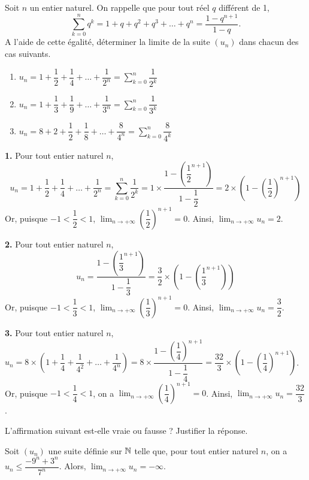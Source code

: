 \documentclass[11pt,fleqn, openany]{book} %
\begin{document}
\begin{exercise}[topic=lim12]Soit $n$ un entier naturel. On rappelle que pour tout réel $q$ différent de 1, 
\[\displaystyle \sum_{k=0}^{n}q^k= 1+q+q^2+q^3+\ldots + q^n=\dfrac{1-q^{n+1}}{1-q}.\]
A l'aide de cette égalité, déterminer la limite de la suite $(u_n)$ dans chacun des cas suivants.
\begin{enumerate}
\item  $u_n=1+\dfrac{1}{2}+\dfrac{1}{4}+\ldots+\dfrac{1}{2^n}=\displaystyle \sum_{k=0}^{n} \dfrac{1}{2^k} $ 
\item  $u_n=1+\dfrac{1}{3}+\dfrac{1}{9}+\ldots+\dfrac{1}{3^n}=\displaystyle \sum_{k=0}^{n} \dfrac{1}{3^k} $ 
\item $u_n=8+2+\dfrac{1}{2}+\dfrac{1}{8}+\ldots+\dfrac{8}{4^n}=\displaystyle \sum_{k=0}^{n} \dfrac{8}{4^k} $ 
\end{enumerate}\end{exercise}

\begin{solution}\textbf{1.} Pour tout entier naturel $n$, \[u_n = 1+\dfrac{1}{2}+\dfrac{1}{4}+\ldots + \dfrac{1}{2^n} = \sum_{k=0}^n \dfrac{1}{2^k}=1 \times \dfrac{1-\left(\dfrac{1}{2}^{n+1}\right)}{1-\dfrac{1}{2}}=2\times \left(1-\left(\dfrac{1}{2}\right)^{n+1}\right)\] Or, puisque $-1<\dfrac{1}{2}<1$, $\displaystyle \lim_{n \to +\infty} \left(\dfrac{1}{2}\right)^{n+1}=0$. Ainsi, $\displaystyle \lim_{n \to +\infty}u_n =2$.

\textbf{2.} Pour tout entier naturel $n$, \[u_n = \dfrac{1-\left(\dfrac{1}{3}^{n+1}\right)}{1-\dfrac{1}{3}}=\dfrac{3}{2} \times \left(1-\left(\dfrac{1}{3}^{n+1}\right)\right)\]
Or, puisque $-1<\dfrac{1}{3}<1$, $\displaystyle \lim_{n \to +\infty} \left(\dfrac{1}{3}\right)^{n+1}=0$. Ainsi, $\displaystyle \lim_{n \to +\infty}u_n=\dfrac{3}{2}$.

\textbf{3.} Pour tout entier naturel $n$, $u_n=8 \times \left(1+\dfrac{1}{4}+\dfrac{1}{4^2}+\ldots +\dfrac{1}{4^n}\right)=8\times \dfrac{1-\left(\dfrac{1}{4}\right)^{n+1}}{1-\dfrac{1}{4}}=\dfrac{32}{3} \times \left(1-\left(\dfrac{1}{4}\right)^{n+1}\right)$. Or, puisque $-1<\dfrac{1}{4}<1$, on a $\displaystyle \lim_{n \to +\infty} \left(\dfrac{1}{4}\right)^{n+1}=0$.
Ainsi, $\displaystyle \lim_{n \to +\infty}u_n =\dfrac{32}{3}$.
\end{solution}



\begin{exercise}[topic=lim12, subtitle={(Asie 2024)}]
L'affirmation suivant est-elle vraie ou fausse ? Justifier la réponse.

Soit $(u_n)$ une suite définie sur $\mathbb{N}$ telle que, pour tout entier naturel $n$, on a $u_n\leqslant \dfrac{-9^n+3^n}{7^n}$. Alors, $\displaystyle\lim_{n \to +\infty}u_n=-\infty$.\end{exercise}
\end{document}
